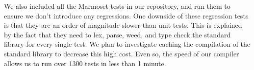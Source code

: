 \documentclass[12pt, titlepage]{article}
\begin{document}
We also included all the Marmoset tests in our repository, and run them to
ensure we don't introduce any regressions. One downside of these regression
tests is that they are an order of magnitude slower than unit tests. This is
explained by the fact that they need to lex, parse, weed, and type check the
standard library for every single test. We plan to investigate caching the
compilation of the standard library to decrease this high cost. Even so, the
speed of our compiler allows us to run over 1300 tests in less than 1 minute.
\end{document}
